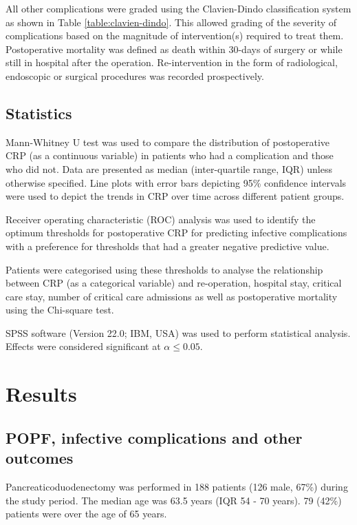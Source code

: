 All other complications were graded using the Clavien-Dindo classification system as shown in Table \ref{table:clavien-dindo}. 
This allowed grading of the severity of complications based on the magnitude of intervention(s) required to treat them. 
Postoperative mortality was defined as death within 30-days of surgery or while still in hospital after the operation. 
Re-intervention in the form of radiological, endoscopic or surgical procedures was recorded prospectively.

\subsection{Statistics}
Mann-Whitney U test was used to compare the distribution of postoperative CRP (as a continuous variable) in patients who had a complication and those who did not. 
Data are presented as median (inter-quartile range, IQR) unless otherwise specified. 
Line plots with error bars depicting 95\% confidence intervals were used to depict the trends in CRP over time across different patient groups. 

Receiver operating characteristic (ROC) analysis \parencite{robertson_use_1981,zweig_receiver-operating_1993} was used to identify the optimum thresholds for postoperative CRP for predicting infective complications with a preference for thresholds that had a greater negative predictive value. 

Patients were categorised using these thresholds to analyse the relationship between CRP (as a categorical variable) and re-operation, hospital stay, critical care stay, number of critical care admissions as well as postoperative mortality using the Chi-square test. 

SPSS software (Version 22.0; IBM, USA) was used to perform statistical analysis. 
Effects were considered significant at $\alpha \leq0.05$. 

\clearpage
\section{Results}

\subsection{POPF, infective complications and other outcomes}
Pancreaticoduodenectomy was performed in 188 patients (126 male, 67\%) during the study period. 
The median age was 63.5 years (IQR 54 - 70 years). 79 (42\%) patients were over the age of 65 years. 

